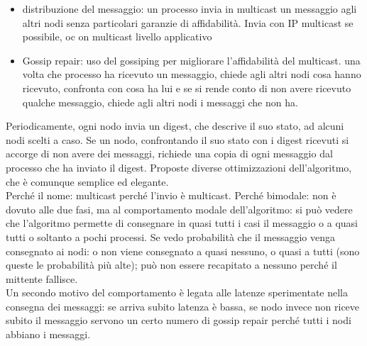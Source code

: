 \documentclass{article}
\begin{document}
\begin{itemize}
\item distribuzione del messaggio: un processo invia in multicast un messaggio agli altri nodi senza particolari garanzie di affidabilità. Invia con IP multicast se possibile, oc on multicast livello applicativo
\item Gossip repair: uso del gossiping per migliorare l'affidabilità del multicast. una volta che processo ha ricevuto un messaggio, chiede agli altri nodi cosa hanno ricevuto, confronta con cosa ha lui e se si rende conto di non avere ricevuto qualche messaggio, chiede agli altri nodi i messaggi che non ha.
\end{itemize}
Periodicamente, ogni nodo invia un digest, che descrive il suo stato, ad alcuni nodi scelti a caso. Se un nodo, confrontando il suo stato con i digest ricevuti si accorge di non avere dei messaggi, richiede una copia di ogni messaggio dal processo che ha inviato il digest. Proposte diverse ottimizzazioni dell'algoritmo, che è comunque semplice ed elegante.\\ Perché il nome: multicast perché l'invio è multicast. Perché bimodale: non è  dovuto alle due fasi, ma al comportamento modale dell'algoritmo: si può vedere che l'algoritmo permette di consegnare in quasi tutti i casi il messaggio o a quasi tutti o soltanto a pochi processi. Se vedo probabilità che il messaggio venga consegnato ai nodi: o non viene consegnato a quasi nessuno, o quasi a tutti (sono queste le probabilità più alte); può non essere recapitato a nessuno perché il mittente fallisce.\\ Un secondo motivo del comportamento è legata alle latenze sperimentate nella consegna dei messaggi: se arriva subito latenza è bassa, se nodo invece non riceve subito il messaggio servono un certo numero di gossip repair perché tutti i nodi abbiano i messaggi.
\end{document}
